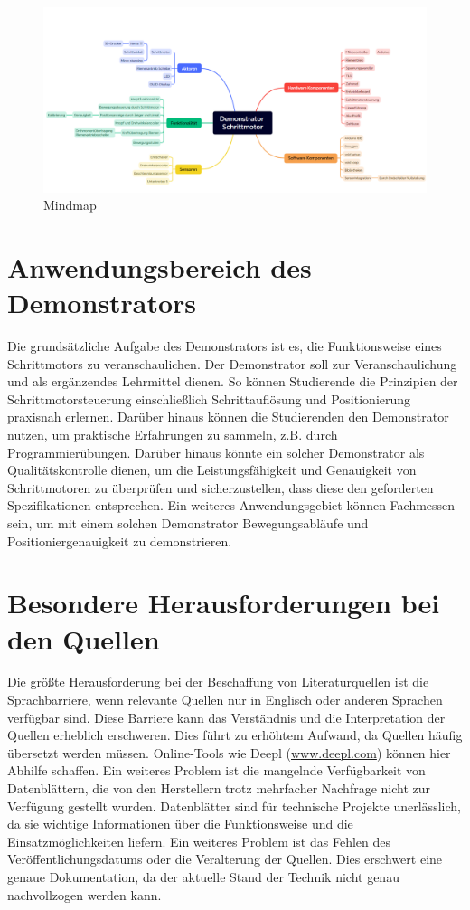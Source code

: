 \begin{figure}[H]
	\begin{center}
		\includegraphics[width=\textwidth]{../Appendix/Mindmap/Mindmap.png}
		\caption{Mindmap} \label{Mindmap}
	\end{center}
\end{figure} 

\section{Anwendungsbereich des Demonstrators}

Die grundsätzliche Aufgabe des Demonstrators ist es, die Funktionsweise eines Schrittmotors zu veranschaulichen. Der Demonstrator soll zur Veranschaulichung und als ergänzendes Lehrmittel dienen. So können Studierende die Prinzipien der Schrittmotorsteuerung einschließlich Schrittauflösung und Positionierung praxisnah erlernen. Darüber hinaus können die Studierenden den Demonstrator nutzen, um praktische Erfahrungen zu sammeln, z.B. durch Programmierübungen. Darüber hinaus könnte ein solcher Demonstrator als Qualitätskontrolle dienen, um die Leistungsfähigkeit und Genauigkeit von Schrittmotoren zu überprüfen und sicherzustellen, dass diese den geforderten Spezifikationen entsprechen. Ein weiteres Anwendungsgebiet können Fachmessen sein, um mit einem solchen Demonstrator Bewegungsabläufe und Positioniergenauigkeit zu demonstrieren.  

\section{Besondere Herausforderungen bei den Quellen}

Die größte Herausforderung bei der Beschaffung von Literaturquellen ist die Sprachbarriere, wenn relevante Quellen nur in Englisch oder anderen Sprachen verfügbar sind. Diese Barriere kann das Verständnis und die Interpretation der Quellen erheblich erschweren. Dies führt zu erhöhtem Aufwand, da Quellen häufig übersetzt werden müssen. Online-Tools wie Deepl (\href{https://www.deepl.com/de/translator}{www.deepl.com}) können hier Abhilfe schaffen. Ein weiteres Problem ist die mangelnde Verfügbarkeit von Datenblättern, die von den Herstellern trotz mehrfacher Nachfrage nicht zur Verfügung gestellt wurden. Datenblätter sind für technische Projekte unerlässlich, da sie wichtige Informationen über die Funktionsweise und die Einsatzmöglichkeiten liefern. Ein weiteres Problem ist das Fehlen des Veröffentlichungsdatums oder die Veralterung der Quellen. Dies erschwert eine genaue Dokumentation, da der aktuelle Stand der Technik nicht genau nachvollzogen werden kann. 